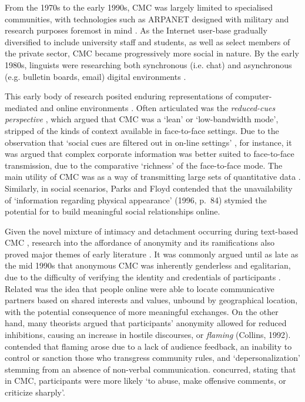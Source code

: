 
From the 1970s to the early 1990s, \gls{CMC} was largely limited to specialised communities, with technologies such as ARPANET designed with military and research purposes foremost in mind \cite{thorne_computer-mediated_2008}. As the Internet user\hyp{}base gradually diversified to include university staff and students, as well as select members of the private sector, \gls{CMC} became progressively more social in nature. By the early 1980s, linguists were researching both synchronous (i.e. chat) and asynchronous (e.g. bulletin boards, email) digital environments \cite[e.g.][]{carey_paralanguage_1980,myers_anonymity_1987,pullinger_chit-chat_1986}.

This early body of research posited enduring representations of computer\hyp{}mediated and online environments \cite{postmes_formation_2000}. Often articulated was the \emph{reduced-cues perspective} \cite{thorne_computer-mediated_2008}, which argued that \gls{CMC} was a `lean' or `low\hyp{}bandwidth mode', stripped of the kinds of context available in face\hyp{}to\hyp{}face settings. Due to the observation that `social cues are filtered out in on\hyp{}line settings' \cite[p.~81]{parks_making_1996}, for instance, it was argued that complex corporate information was better suited to face\hyp{}to\hyp{}face transmission, due to the comparative `richness' of the face\hyp{}to\hyp{}face \gls{mode}. The main utility of \gls{CMC} was as a way of transmitting large sets of quantitative data \cite{daft_information_1983}. Similarly, in social scenarios, Parks and Floyd contended that the unavailability of `information regarding physical appearance' (1996, p.~84) stymied the potential for  to build meaningful social relationships online.


Given the novel mixture of intimacy and detachment occurring during text\hyp{}based \gls{CMC} \cite{king_researching_1996}, research into the affordance of anonymity and its ramifications also proved major themes of early literature \cite{tanis_two_2007}. It was commonly argued until as late as the mid 1990s that anonymous \gls{CMC} was inherently genderless and egalitarian, due to the difficulty of verifying the identity and credentials of participants \cite{herring_computer-mediated_2001}. Related was the idea that people online were able to locate communicative partners based on shared interests and values, unbound by geographical location, with the potential consequence of more meaningful exchanges. On the other hand, many theorists argued that participants' anonymity allowed for reduced inhibitions, causing an increase in hostile discourses, or \emph{flaming} (Collins, 1992). \textcite{kiesler_social_1984} contended that flaming arose due to a lack of audience feedback, an inability to control or sanction those who transgress community rules, and `depersonalization' stemming from an absence of non\hyp{}verbal communication. \textcite[p.~7]{kim_verbal_1991} concurred, stating that in \gls{CMC}, participants were more likely `to abuse, make offensive comments, or criticize sharply'.

